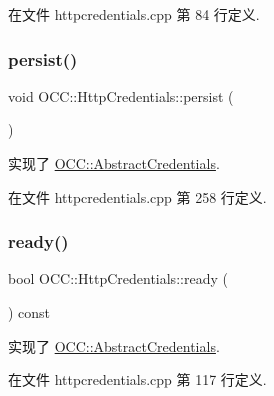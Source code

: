 在文件 httpcredentials.\+cpp 第 84 行定义.

\mbox{\label{class_o_c_c_1_1_http_credentials_a643967b90af32f27a6d076608ef7dccc}} 
\subsubsection{\texorpdfstring{persist()}{persist()}}
{\footnotesize\ttfamily void O\+C\+C\+::\+Http\+Credentials\+::persist (\begin{DoxyParamCaption}{ }\end{DoxyParamCaption})\hspace{0.3cm}{\ttfamily [virtual]}}



实现了 \hyperlink{class_o_c_c_1_1_abstract_credentials_ab4af03be7d9e7e330345b8f13e67a544}{O\+C\+C\+::\+Abstract\+Credentials}.



在文件 httpcredentials.\+cpp 第 258 行定义.

\mbox{\label{class_o_c_c_1_1_http_credentials_afa37b021762c649fe434024130edba4b}} 
\subsubsection{\texorpdfstring{ready()}{ready()}}
{\footnotesize\ttfamily bool O\+C\+C\+::\+Http\+Credentials\+::ready (\begin{DoxyParamCaption}{ }\end{DoxyParamCaption}) const\hspace{0.3cm}{\ttfamily [virtual]}}



实现了 \hyperlink{class_o_c_c_1_1_abstract_credentials_a77adad4957e0365be40db7fe4499a86b}{O\+C\+C\+::\+Abstract\+Credentials}.



在文件 httpcredentials.\+cpp 第 117 行定义.

\mbox{\label{class_o_c_c_1_1_http_credentials_a630fbda6f313ade505f4bc69c99ed8c6}} 

